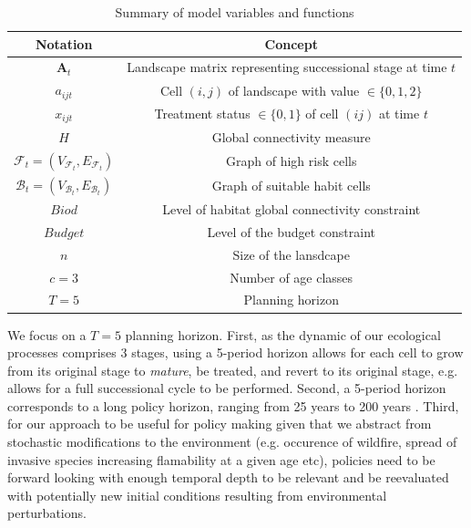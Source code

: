 \begin{table}[h]
\centering
\begin{tabular}{|c|c|}
\hline
Notation & Concept \\
\hline \hline
$\mathbf{A}_t$ & Landscape matrix representing successional stage at time $t$ \\
$a_{ijt}$ & Cell $(i,j)$ of landscape  with value $\in \{0,1,2\}$\\
$x_{ijt}$ & Treatment status $\in\{0,1\}$ of cell $(ij)$ at time $t$ \\
$H$ & Global connectivity measure\\
$\mathcal{F}_t = (V_{\mathcal{F}_t}, E_{\mathcal{F}_t})$ & Graph of high risk cells\\
$\mathcal{B}_t = (V_{\mathcal{B}_t}, E_{\mathcal{B}_t})$ & Graph of suitable habit cells\\
$Biod$ & Level of habitat global connectivity constraint\\
$Budget$ & Level of the budget constraint\\
$n$ & Size of the lansdcape\\
$c = 3$ & Number of age classes \\
$T=5$ & Planning horizon\\
\hline 
\end{tabular}
\caption{Summary of model variables and functions}
\end{table}
We focus on a $T=5$ planning horizon. First, as the dynamic of our ecological processes comprises 3 stages, using a 5-period horizon allows for each cell to grow from its original stage to \textit{mature}, be treated, and revert to its original stage, e.g. allows for a full successional cycle to be performed. Second, a 5-period horizon corresponds to a long policy horizon, ranging from 25 years to 200 years \citep{mccoll_gausden_pathways_2019, thomas_wildlife_1979}.
Third, for our approach to be useful for policy making given that we abstract from stochastic modifications to the environment (e.g. occurence of wildfire, spread of invasive species increasing flamability at a given age etc), policies need to be forward looking with enough temporal depth to be relevant and be reevaluated with potentially new initial conditions resulting from environmental perturbations.\\
